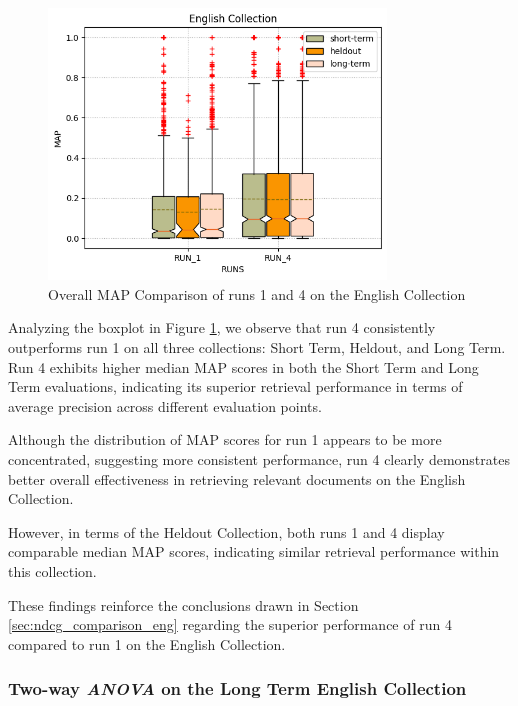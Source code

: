 \begin{figure}[!h]
\centering
\includegraphics[width=0.8\textwidth]{figure/StatisticalAnalysis/BoxPlot/MAP English.png}
\caption{Overall \ac{MAP} Comparison of runs 1 and 4 on the English Collection}
\label{fig:map_english}
\end{figure}
 
Analyzing the boxplot in Figure \ref{fig:map_english}, we observe that run 4 consistently outperforms run 1 on all three collections: Short Term, Heldout, and Long Term. 
Run 4 exhibits higher median \ac{MAP} scores in both the Short Term and Long Term evaluations, indicating its superior retrieval performance in terms of average precision across different evaluation points.

Although the distribution of \ac{MAP} scores for run 1 appears to be more concentrated, suggesting more consistent performance, run 4 clearly demonstrates better overall effectiveness in retrieving relevant documents on the English Collection.

However, in terms of the Heldout Collection, both runs 1 and 4 display comparable median \ac{MAP} scores, indicating similar retrieval performance within this collection. 

These findings reinforce the conclusions drawn in Section \ref{sec:ndcg_comparison_eng} regarding the superior performance of run 4 compared to run 1 on the English Collection. 


\newpage
\enlargethispage{8\baselineskip}
\subsubsection{Two-way \textit{ANOVA} on the Long Term English Collection}

